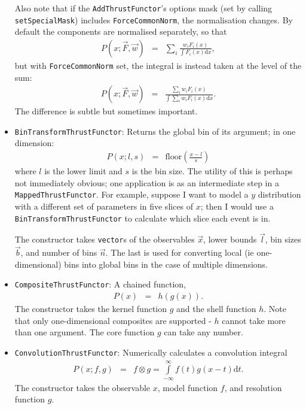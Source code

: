 \documentclass[12pt,pdflatex]{article}
\begin{document}
\begin{itemize}
Also note that if the \texttt{AddThrustFunctor}'s options mask (set by calling
\texttt{setSpecialMask}) includes \texttt{ForceCommonNorm}, the normalisation changes.
By default the components are normalised separately, so that
\begin{eqnarray}
P(x;\vec F, \vec w) &=& \sum\limits_i \frac{w_iF_i(x)}{\int F_i(x) \mathrm{d}x},
\end{eqnarray}
but with \texttt{ForceCommonNorm} set, the integral is instead taken at
the level of the sum:
\begin{eqnarray}
P(x;\vec F, \vec w) &=& \frac{\sum\limits_i w_iF_i(x)}{\int\sum\limits_i w_iF_i(x)\mathrm{d}x}.
\end{eqnarray}
The difference is subtle but sometimes important. 
\item \texttt{BinTransformThrustFunctor}: Returns the global bin of its argument; in one dimension:
\begin{eqnarray}
P(x;l,s) &=& \mathrm{floor}\left(\frac{x-l}{s}\right)
\end{eqnarray}
where $l$ is the lower limit and $s$ is the bin size. The utility of
this is perhaps not immediately obvious; one application is as an intermediate
step in a \texttt{MappedThrustFunctor}. For example, suppose I want to 
model a $y$ distribution with a different set of parameters in five slices
of $x$; then I would use a \texttt{BinTransformThrustFunctor} to calculate
which slice each event is in. 

The constructor
takes \texttt{vector}s of the observables $\vec x$, lower bounds $\vec l$,
bin sizes $\vec b$, and number of bins $\vec n$. The last is used for converting
local (ie one-dimensional) bins into global bins in the case of multiple dimensions. 
\item \texttt{CompositeThrustFunctor}: A chained function, 
\begin{eqnarray}
P(x) &=& h(g(x)).
\end{eqnarray}
The constructor takes the kernel function $g$ and the shell function $h$. 
Note that only one-dimensional composites are supported - $h$ cannot take more
than one argument. The core function $g$ can take any number. 
\item \texttt{ConvolutionThrustFunctor}: Numerically calculates a convolution integral
\begin{eqnarray}
P(x;f,g) &=& f\otimes g = \int\limits_{-\infty}^\infty f(t) g(x-t) \mathrm{d}t.
\end{eqnarray}
The constructor takes the observable $x$, model function $f$, and resolution function $g$.


\end{itemize}
\end{document}
